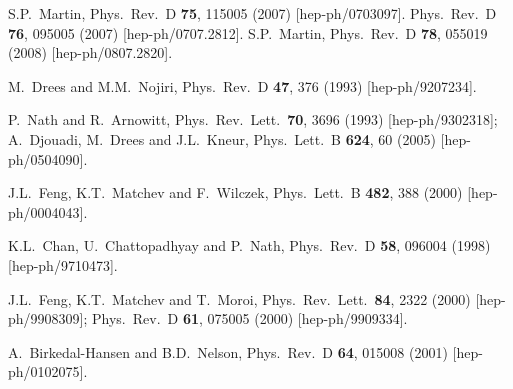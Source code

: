 \documentclass[11pt]{article}
\begin{document}
\begin{thebibliography}{999}
S.P.~Martin,
  Phys.\ Rev.\  D {\bf 75}, 115005 (2007)
  [hep-ph/0703097].
  Phys.\ Rev.\  D {\bf 76}, 095005 (2007)
  [hep-ph/0707.2812].
  S.P.~Martin,
  Phys.\ Rev.\  D {\bf 78}, 055019 (2008)
  [hep-ph/0807.2820].

M.~Drees and M.M.~Nojiri,
  Phys.\ Rev.\ D {\bf 47}, 376 (1993)
  [hep-ph/9207234].
  
P.~Nath and R.~Arnowitt,
  Phys.\ Rev.\ Lett.\  {\bf 70}, 3696 (1993)
  [hep-ph/9302318];
A.~Djouadi, M.~Drees and J.L.~Kneur,
  Phys.\ Lett.\ B {\bf 624}, 60 (2005)
  [hep-ph/0504090].
   
J.L.~Feng, K.T.~Matchev and F.~Wilczek,
  Phys.\ Lett.\ B {\bf 482}, 388 (2000)
  [hep-ph/0004043].

  K.L.~Chan, U.~Chattopadhyay and P.~Nath,
  Phys.\ Rev.\ D {\bf 58}, 096004 (1998)
  [hep-ph/9710473].

J.L.~Feng, K.T.~Matchev and T.~Moroi,
  Phys.\ Rev.\ Lett.\  {\bf 84}, 2322 (2000)
  [hep-ph/9908309];
  Phys.\ Rev.\ D {\bf 61}, 075005 (2000)
  [hep-ph/9909334].

A.~Birkedal-Hansen and B.D.~Nelson,
  Phys.\ Rev.\ D {\bf 64}, 015008 (2001)
  [hep-ph/0102075].


\end{thebibliography}
\end{document}
